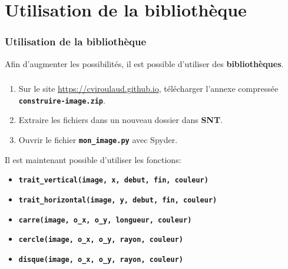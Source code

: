\documentclass[svgnames,11pt]{beamer}
\begin{document}
\section{Utilisation de la bibliothèque}
\begin{frame}
    \frametitle{Utilisation de la bibliothèque}

Afin d'augmenter les possibilités, il est possible d'utiliser des \textbf{bibliothèques}. 

\end{frame}
\begin{frame}
    \frametitle{}

    \begin{activite}
    \begin{enumerate}
        \item Sur le site \url{https://cviroulaud.github.io}, télécharger l'annexe compressée \textbf{\texttt{construire-image.zip}}.
        \item Extraire les fichiers dans un nouveau dossier dans \textbf{SNT}.
        \item Ouvrir le fichier \textbf{\texttt{mon\_image.py}} avec Spyder.
    \end{enumerate}
Il est maintenant possible d'utiliser les fonctions:
\begin{itemize}
    \item \textbf{\texttt{trait\_vertical(image, x, debut, fin, couleur)}}
    \item \textbf{\texttt{trait\_horizontal(image, y, debut, fin, couleur)}}
    \item \textbf{\texttt{carre(image, o\_x, o\_y, longueur, couleur)}}
    \item \textbf{\texttt{cercle(image, o\_x, o\_y, rayon, couleur)}}
    \item \textbf{\texttt{disque(image, o\_x, o\_y, rayon, couleur)}}
\end{itemize}
    \end{activite}

\end{frame}
\end{document}
